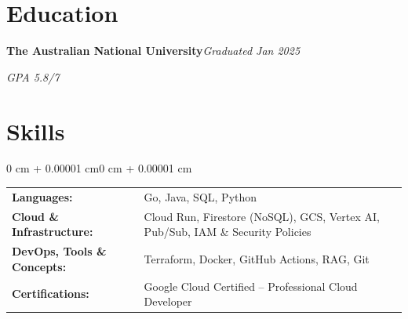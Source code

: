\documentclass[10pt, letterpaper]{article}
\newenvironment{onecolentry}{
    \begin{adjustwidth}{0 cm + 0.00001 cm}{0 cm + 0.00001 cm}
}{
    \end{adjustwidth}
}
\begin{document}
\section{Education}
\vspace{0.1cm}

\textbf{The Australian National University}\hfill{}\textit{Graduated Jan 2025}


\vspace{0.1cm}

\hspace{0.5cm}{Bachelor of Actuarial Studies}\hfill{}\textit{GPA 5.8/7}

\vspace{0.1cm}

\hspace{0.5cm}{Bachelor of Finance (Quantitative Finance)}\hfill{} 

\section{Skills}
\vspace{0.1cm}

\begin{onecolentry}
    \begin{tabularx}{\linewidth}{@{} l X @{}}
        \textbf{Languages:}           & Go, Java, SQL, Python \\[0.2cm]
        \textbf{Cloud \& Infrastructure:} & Cloud Run, Firestore (NoSQL), GCS, Vertex AI, Pub/Sub, IAM \& Security Policies \\[0.2cm]
        \textbf{DevOps, Tools \& Concepts:}     & Terraform, Docker, GitHub Actions, RAG, Git  \\[0.2cm]
        \textbf{Certifications:}      & Google Cloud Certified – Professional Cloud Developer      \\[0.2cm]
    \end{tabularx}
\end{onecolentry}
\end{document}
